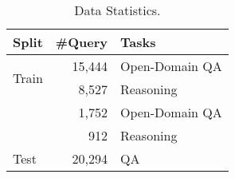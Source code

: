 \begin{table}[t]
  \centering
  \begin{tabular}{l|rl}
    \hline
    \textbf{Split} &\textbf{\#Query} &\textbf{Tasks}\\
    \hline
    \multirow{2}{*}{Train} &{15,444} &{Open-Domain QA}\\
    &{8,527} &{Reasoning}\\
    \hdashline
    \multirow{2}{*}{Dev} &{1,752} &{Open-Domain QA}\\
    &{912} &{Reasoning}\\
    \hdashline
    Test &{20,294} &{QA}\\
    \hline
  \end{tabular}
  \caption{\label{data statistics simple}Data Statistics.}
\end{table}